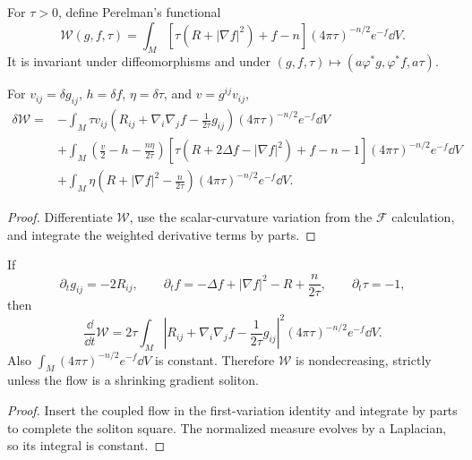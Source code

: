 For $\tau>0$, define Perelman's functional \cite{P1}
\[
\mathcal W(g,f,\tau)=\int_M[\tau(R+|\nabla f|^2)+f-n]
(4\pi\tau)^{-n/2}e^{-f}\dd V.
\]
It is invariant under diffeomorphisms and under
$(g,f,\tau)\mapsto(a\varphi^*g,\varphi^*f,a\tau)$.

\begin{lemma}
  \label{lem:cz-first-variation-of-perelmans-w-functional}
For $v_{ij}=\delta g_{ij}$, $h=\delta f$, $\eta=\delta\tau$, and
$v=g^{ij}v_{ij}$,
\begin{align*}
\delta\mathcal W={}&-\int_M\tau v_{ij}
\left(R_{ij}+\nabla_i\nabla_jf-\frac{1}{2\tau}g_{ij}\right)
(4\pi\tau)^{-n/2}e^{-f}\dd V\\
&+\int_M\left(\frac v2-h-\frac{n\eta}{2\tau}\right)
[\tau(R+2\Delta f-|\nabla f|^2)+f-n-1]
(4\pi\tau)^{-n/2}e^{-f}\dd V\\
&+\int_M\eta\left(R+|\nabla f|^2-\frac{n}{2\tau}\right)
(4\pi\tau)^{-n/2}e^{-f}\dd V.
\end{align*}
\end{lemma}
\begin{proof}
\sketch Differentiate $\mathcal W$, use the scalar-curvature
variation from the $\mathcal F$ calculation, and integrate the weighted
derivative terms by parts.
\end{proof}

\begin{proposition}
  \label{prop:cz-monotonicity-of-perelmans-w-functional}
If
\[
\partial_tg_{ij}=-2R_{ij},\qquad
\partial_tf=-\Delta f+|\nabla f|^2-R+\frac{n}{2\tau},\qquad
\partial_t\tau=-1,
\]
then
\[
\frac{\dd}{\dd t}\mathcal W
=2\tau\int_M\left|R_{ij}+\nabla_i\nabla_jf-\frac{1}{2\tau}g_{ij}\right|^2
(4\pi\tau)^{-n/2}e^{-f}\dd V.
\]
Also $\int_M(4\pi\tau)^{-n/2}e^{-f}\dd V$ is constant.  Therefore
$\mathcal W$ is nondecreasing, strictly unless the flow is a
shrinking gradient soliton.
\end{proposition}
\begin{proof}
\sketch Insert the coupled flow in the first-variation identity and
integrate by parts to complete the soliton square.  The normalized
measure evolves by a Laplacian, so its integral is constant.
\end{proof}

